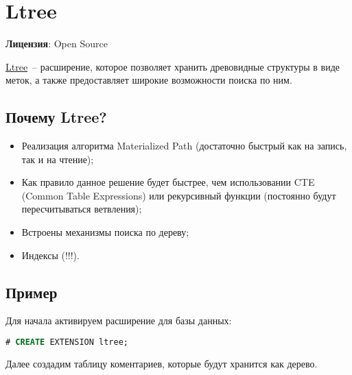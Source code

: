 \section{Ltree}
\textbf{Лицензия}: Open Source

\href{https://www.postgresql.org/docs/current/static/ltree.html}{Ltree}~-- расширение, которое позволяет хранить древовидные структуры в виде меток, а также предоставляет широкие возможности поиска по ним.

\subsection{Почему Ltree?}

\begin{itemize}
  \item Реализация алгоритма Materialized Path (достаточно быстрый как на запись, так и на чтение);
  \item Как правило данное решение будет быстрее, чем использовании CTE (Common Table Expressions) или рекурсивный функции (постоянно будут пересчитываться ветвления);
  \item Встроены механизмы поиска по дереву;
  \item Индексы (!!!).
\end{itemize}

\subsection{Пример}

Для начала активируем расширение для базы данных:

\begin{lstlisting}[language=SQL,label=lst:pgltree1,caption=Ltree]
# CREATE EXTENSION ltree;
\end{lstlisting}

Далее создадим таблицу коментариев, которые будут хранится как дерево.

